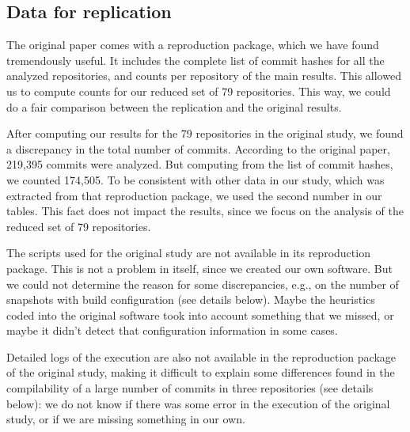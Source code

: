 
\subsection{Data for replication}

The original paper comes with a reproduction package, which we have found tremendously useful. It includes the complete list of commit hashes for all the analyzed repositories, and counts per repository of the main results. This allowed us to compute counts for our reduced set of 79 repositories. This way, we could do a fair comparison between the replication and the original results.

After computing our results for the 79 repositories in the original study, we found a discrepancy in the total number of commits. According to the original paper, 219,395 commits were analyzed. But computing from the list of commit hashes, we counted 174,505. To be consistent with other data in our study, which was extracted from that reproduction package, we used the second number in our tables. This fact does not impact the results, since we focus on the analysis of the reduced set of 79 repositories.

The scripts used for the original study are not available in its reproduction package. This is not a problem in itself, since we created our own software. But we could not determine the reason for some discrepancies, e.g., on the number of snapshots with build configuration (see details below). Maybe the heuristics coded into the original software took into account something that we missed, or maybe it didn't detect that configuration information in some cases.

Detailed logs of the execution are also not available in the reproduction package of the original study, making it difficult to explain some differences found in the compilability of a large number of commits in three repositories (see details below): we do not know if there was some error in the execution of the original study, or if we are missing something in our own.

\vspace{0.3cm}

